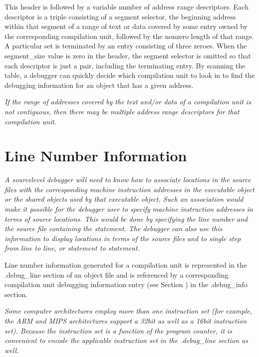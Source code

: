 This header is followed by a variable number of address range
descriptors. Each descriptor is a triple consisting of a
segment selector, the beginning address within that segment
of a range of text or data covered by some entry owned by
the corresponding compilation unit, followed by the non\dash zero
length of that range. A particular set is terminated by an
entry consisting of three zeroes. When the segment\_size value
is zero in the header, the segment selector is omitted so that
each descriptor is just a pair, including the terminating
entry. By scanning the table, a debugger can quickly decide
which compilation unit to look in to find the debugging
information for an object that has a given address.

\textit{If the range of addresses covered by the text and/or data
of a compilation unit is not contiguous, then there may be
multiple address range descriptors for that compilation unit.}




\section{Line Number Information}
\label{chap:linenumberinformation}
\textit{A source\dash level debugger will need to know how to
associate locations in the source files with the corresponding
machine instruction addresses in the executable object or
the shared objects used by that executable object. Such an
association would make it possible for the debugger user
to specify machine instruction addresses in terms of source
locations. This would be done by specifying the line number
and the source file containing the statement. The debugger
can also use this information to display locations in terms
of the source files and to single step from line to line,
or statement to statement.}

Line number information generated for a compilation unit is
represented in the .debug\_line section of an object file and
is referenced by a corresponding compilation unit debugging
information entry 
(see Section ) 
in the .debug\_info
section.

\textit{Some computer architectures employ more than one instruction
set (for example, the ARM and MIPS architectures support
a 32\dash bit as well as a 16\dash bit instruction set). Because the
instruction set is a function of the program counter, it is
convenient to encode the applicable instruction set in the
.debug\_line section as well.}

